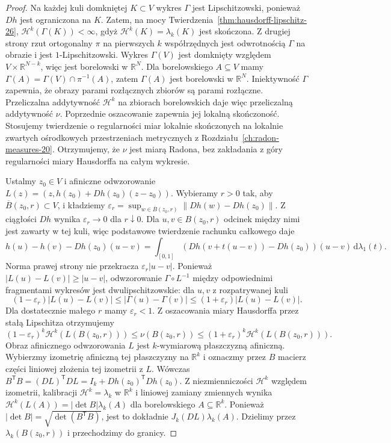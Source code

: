 \begin{proof}
Na każdej kuli domkniętej $K\subset V$ wykres $\Gamma$
jest Lipschitzowski, ponieważ $Dh$ jest ograniczona
na $K$. Zatem, na mocy
Twierdzenia~\ref{thm:hausdorff-lipschitz-26},
$\mathcal H^k(\Gamma(K))<\infty$, gdyż
$\mathcal H^k(K)=\lambda_k(K)$ jest skończona.
Z drugiej strony rzut ortogonalny $\pi$ na
pierwszych $k$ współrzędnych jest odwrotnością
$\Gamma$ na obrazie i jest $1$-Lipschitzowski.
Wykres $\Gamma(V)$ jest domknięty względem
$V\times\mathbb R^{N-k}$, więc jest borelowski w $\mathbb R^N$.
Dla borelowskiego $A\subseteq V$ mamy
$\Gamma(A)=\Gamma(V)\cap\pi^{-1}(A)$, zatem
$\Gamma(A)$ jest borelowski w $\mathbb R^N$.
Iniektywność $\Gamma$ zapewnia, że obrazy parami
rozłącznych zbiorów są parami rozłączne. Przeliczalna
addytywność $\mathcal H^k$ na zbiorach borelowskich
daje więc przeliczalną addytywność $\nu$.
Poprzednie oszacowanie zapewnia jej lokalną skończoność. Stosujemy twierdzenie o
regularności miar lokalnie skończonych na lokalnie
zwartych ośrodkowych przestrzeniach metrycznych
z Rozdziału~\ref{ch:radon-measures-20}.
Otrzymujemy, że $\nu$ jest miarą Radona,
bez zakładania z góry regularności miary
Hausdorffa na całym wykresie.

Ustalmy $z_0\in V$ i afiniczne odwzorowanie
$L(z)=(z,h(z_0)+Dh(z_0)(z-z_0))$.
Wybieramy $r>0$ tak, aby $\overline B(z_0,r)\subset V$,
i kładziemy
$\varepsilon_r=\sup_{w\in\overline B(z_0,r)}
\|Dh(w)-Dh(z_0)\|$. Z ciągłości $Dh$ wynika
$\varepsilon_r\to0$ dla $r\downarrow0$.
Dla $u,v\in B(z_0,r)$ odcinek między nimi
jest zawarty w tej kuli, więc podstawowe
twierdzenie rachunku całkowego daje
\[
 h(u)-h(v)-Dh(z_0)(u-v)
 =\int_{[0,1]}(Dh(v+t(u-v))-Dh(z_0))(u-v)
 \,\mathrm d\lambda_1(t).
\]
Norma prawej strony nie przekracza
$\varepsilon_r|u-v|$.
Ponieważ $|L(u)-L(v)|\ge|u-v|$,
odwzorowanie $\Gamma\circ L^{-1}$ między
odpowiednimi fragmentami wykresów jest
dwulipschitzowskie: dla $u,v$ z rozpatrywanej kuli
\[
 (1-\varepsilon_r)|L(u)-L(v)|
 \le|\Gamma(u)-\Gamma(v)|
 \le(1+\varepsilon_r)|L(u)-L(v)|.
\]
Dla dostatecznie małego $r$ mamy $\varepsilon_r<1$.
Z oszacowania miary Hausdorffa przez stałą
Lipschitza otrzymujemy
\[
 (1-\varepsilon_r)^k\mathcal H^k(L(B(z_0,r)))
 \le\nu(B(z_0,r))\le
 (1+\varepsilon_r)^k\mathcal H^k(L(B(z_0,r))).
\]
Obraz afinicznego odwzorowania $L$ jest
$k$-wymiarową płaszczyzną afiniczną. Wybierzmy izometrię
afiniczną tej płaszczyzny na $\mathbb R^k$ i oznaczmy przez
$B$ macierz części liniowej złożenia tej izometrii z $L$.
Wówczas $B^{\mathsf T}B=(DL)^{\mathsf T}DL=
I_k+Dh(z_0)^{\mathsf T}Dh(z_0)$.
Z niezmienniczości $\mathcal H^k$ względem izometrii,
kalibracji $\mathcal H^k=\lambda_k$ w $\mathbb R^k$
i liniowej zamiany zmiennych wynika
$\mathcal H^k(L(A))=|\det B|\lambda_k(A)$
dla borelowskiego $A\subseteq\mathbb R^k$.
Ponieważ $|\det B|=\sqrt{\det(B^{\mathsf T}B)}$,
jest to dokładnie $J_k(DL)\lambda_k(A)$.
Dzielimy przez $\lambda_k(B(z_0,r))$ i
przechodzimy do granicy.
\end{proof}

